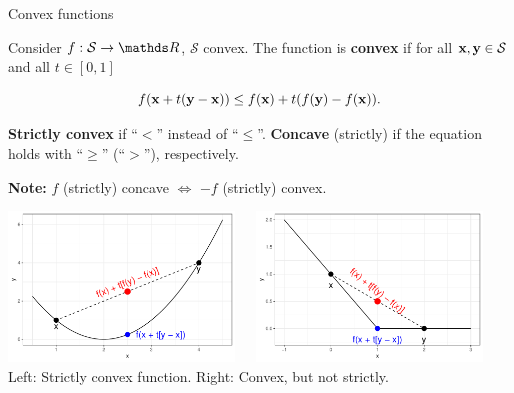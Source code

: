 \begin{vbframe}{Convex functions}

Consider $f: \mathcal{S} \to \R$, $\mathcal{S}$ convex. The function is \textbf{convex} if for all $\mathbf{x}, \mathbf{y} \in \mathcal{S}$ and all $t \in [0, 1]$

\vspace*{-0.2cm}

$$
f(\mathbf{x} + t(\mathbf{y} - \mathbf{x})) \le f(\mathbf{x}) + t(f(\mathbf{y}) - f(\mathbf{x})).
$$

\textbf{Strictly convex} if \enquote{$<$} instead of \enquote{$\le$}. \textbf{Concave} (strictly) if the equation holds with \enquote{$\ge$} (\enquote{$>$}), respectively. 

\vspace*{0.2cm}

\textbf{Note:} $f$ (strictly) concave $\Leftrightarrow$ $-f$ (strictly) convex.


\begin{center}
\includegraphics[width = 0.45\textwidth, keepaspectratio]{figure_man/convexity_1.pdf}~~~\includegraphics[width = 0.45\textwidth, keepaspectratio]{figure_man/convexity_2.pdf} \\
\footnotesize{Left: Strictly convex function. Right: Convex, but not strictly. }
\end{center}

\end{vbframe}

